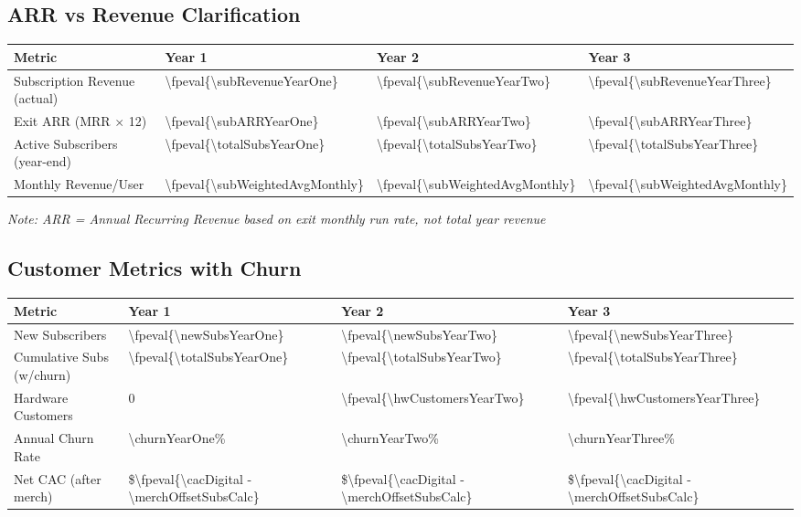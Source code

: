 \documentclass[11pt]{article}
\newcommand{\numfpeval}[1]{\num{\fpeval{#1}}}
\newcommand{\numint}[1]{\num[round-precision=0]{\fpeval{#1}}}
\begin{document}
\subsection{ARR vs Revenue Clarification}
\begin{table}[H]
\centering
\begin{tabularx}{\linewidth}{l Y Y Y}
\toprule
Metric & Year 1 & Year 2 & Year 3 \\\midrule
Subscription Revenue (actual) & \numint{\subRevenueYearOne} & \numint{\subRevenueYearTwo} & \numint{\subRevenueYearThree} \\
Exit ARR (MRR $\times$ 12) & \numint{\subARRYearOne} & \numint{\subARRYearTwo} & \numint{\subARRYearThree} \\
Active Subscribers (year-end) & \numint{\totalSubsYearOne} & \numint{\totalSubsYearTwo} & \numint{\totalSubsYearThree} \\
Monthly Revenue/User & \numfpeval{\subWeightedAvgMonthly} & \numfpeval{\subWeightedAvgMonthly} & \numfpeval{\subWeightedAvgMonthly} \\
\bottomrule
\end{tabularx}
\end{table}
\textit{Note: ARR = Annual Recurring Revenue based on exit monthly run rate, not total year revenue}

\subsection{Customer Metrics with Churn}
\begin{table}[H]
\centering
\begin{tabularx}{\linewidth}{l Y Y Y}
\toprule
Metric & Year 1 & Year 2 & Year 3 \\\midrule
New Subscribers & \numint{\newSubsYearOne} & \numint{\newSubsYearTwo} & \numint{\newSubsYearThree} \\
Cumulative Subs (w/churn) & \numint{\totalSubsYearOne} & \numint{\totalSubsYearTwo} & \numint{\totalSubsYearThree} \\
Hardware Customers & \num{0} & \numint{\hwCustomersYearTwo} & \numint{\hwCustomersYearThree} \\
Annual Churn Rate\cite{recurly2024} & \num{\churnYearOne}\% & \num{\churnYearTwo}\% & \num{\churnYearThree}\% \\
Net CAC (after merch) & \$\numint{\cacDigital - \merchOffsetSubsCalc} & \$\numint{\cacDigital - \merchOffsetSubsCalc} & \$\numint{\cacDigital - \merchOffsetSubsCalc} \\
\bottomrule
\end{tabularx}
\end{table}
\end{document}
